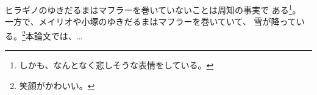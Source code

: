 

\showversion
ヒラギノのゆきだるまはマフラーを巻いていないことは周知の事実で
ある\footnote{しかも、なんとなく悲しそうな表情をしている。}。
一方で、メイリオや小塚のゆきだるまはマフラーを巻いていて、
雪が降っている。\footnote{笑顔がかわいい。}本論文では、…

